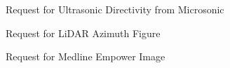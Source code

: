 
\begin{center}
\newline Request for Ultrasonic Directivity from Microsonic\\

\vspace{3\baselineskip} %

\newline Request for LiDAR Azimuth Figure\\

\vspace{3\baselineskip} %

\newline Request for Medline Empower Image\\
\end{center}